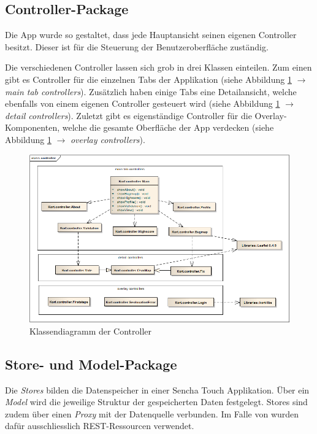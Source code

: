 \subsection{Controller-Package}

Die App wurde so gestaltet, dass jede Hauptansicht seinen eigenen Controller besitzt.
Dieser ist für die Steuerung der Benutzeroberfläche zuständig.

Die verschiedenen Controller lassen sich grob in drei Klassen einteilen.
Zum einen gibt es Controller für die einzelnen Tabs der Applikation (siehe Abbildung \ref{image-kort-classdiagram-controller} $\rightarrow$ \emph{main tab controllers}).
Zusätzlich haben einige Tabs eine Detailansicht, welche ebenfalls von einem eigenen Controller gesteuert wird (siehe Abbildung \ref{image-kort-classdiagram-controller} $\rightarrow$ \emph{detail controllers}).
Zuletzt gibt es eigenständige Controller für die Overlay-Komponenten, welche die gesamte Oberfläche der App verdecken (siehe Abbildung \ref{image-kort-classdiagram-controller} $\rightarrow$ \emph{overlay controllers}).

\begin{figure}[H]
	\centering
	\includegraphics[width=\textwidth]{images/uml/kort-classdiagram-controller}
	\caption{Klassendiagramm der Controller}
	\label{image-kort-classdiagram-controller}
\end{figure}

\subsection{Store- und Model-Package}
\label{kort-store-model-package}

Die \emph{Stores} bilden die Datenspeicher in einer Sencha Touch Applikation.
Über ein \emph{Model} wird die jeweilige Struktur der gespeicherten Daten festgelegt.
Stores sind zudem über einen \emph{Proxy} mit der Datenquelle verbunden.
Im Falle von \kort{} wurden dafür ausschliesslich REST-Ressourcen verwendet.

